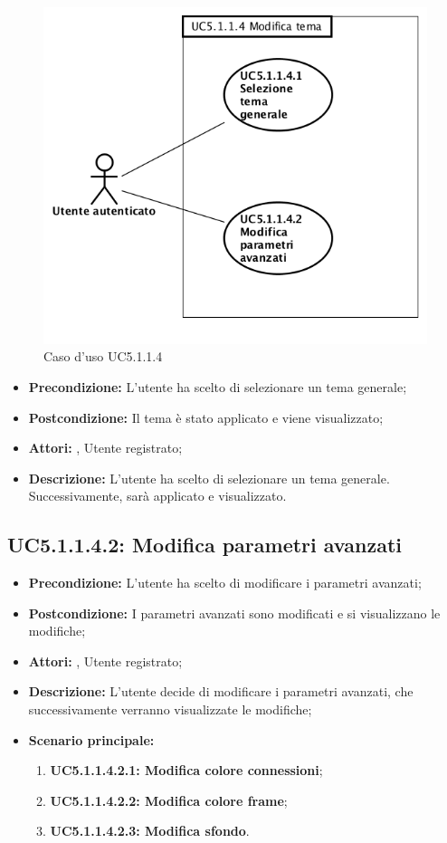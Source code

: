 \begin{figure}[h]
	\begin{center}
	\includegraphics[scale=0.4]{diagram/UC5-1-1-4.png}
	\caption{Caso d'uso UC5.1.1.4}
	\end{center}
\end{figure}
\begin{itemize}
	\item \textbf{Precondizione:} L'utente ha scelto di selezionare un tema generale;
	\item \textbf{Postcondizione:} Il tema è stato applicato e viene visualizzato;
	\item \textbf{Attori:} , Utente registrato;
	\item \textbf{Descrizione:} L'utente ha scelto di selezionare un tema generale. Successivamente, sarà applicato e visualizzato.
\end{itemize}
\subsection{ UC5.1.1.4.2: Modifica parametri avanzati}

\begin{itemize}
	\item \textbf{Precondizione:} L'utente ha scelto di modificare i parametri avanzati;
	\item \textbf{Postcondizione:} I parametri avanzati sono modificati e si visualizzano le modifiche;
	\item \textbf{Attori:} , Utente registrato;
	\item \textbf{Descrizione:} L'utente decide di modificare i parametri avanzati, che successivamente verranno visualizzate le modifiche;
	\item \textbf{Scenario principale:}
	\begin{enumerate}
		\item \textbf{ UC5.1.1.4.2.1: Modifica colore connessioni};
		\item \textbf{ UC5.1.1.4.2.2: Modifica colore frame};
		\item \textbf{ UC5.1.1.4.2.3: Modifica sfondo}.
	\end{enumerate}
\end{itemize}
